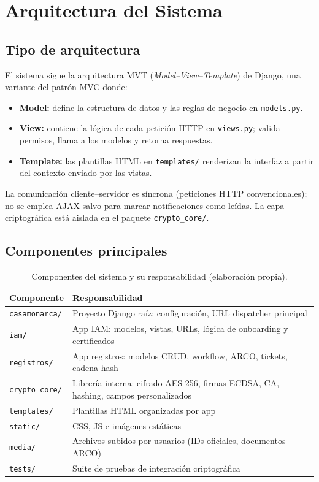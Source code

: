\documentclass[10pt,letterpaper]{report}
\begin{document}
\chapter{Arquitectura del Sistema}

\section{Tipo de arquitectura}

El sistema sigue la arquitectura MVT (\textit{Model--View--Template}) de Django, una variante del patrón MVC donde:
\begin{itemize}[leftmargin=*]
    \item \textbf{Model:} define la estructura de datos y las reglas de negocio en \texttt{models.py}.
    \item \textbf{View:} contiene la lógica de cada petición HTTP en \texttt{views.py}; valida permisos, llama a los modelos y retorna respuestas.
    \item \textbf{Template:} las plantillas HTML en \texttt{templates/} renderizan la interfaz a partir del contexto enviado por las vistas.
\end{itemize}

La comunicación cliente--servidor es síncrona (peticiones HTTP convencionales); no se emplea AJAX salvo para marcar notificaciones como leídas. La capa criptográfica está aislada en el paquete \texttt{crypto\_core/}.

\section{Componentes principales}

\begin{table}[h!]
\centering
\caption{Componentes del sistema y su responsabilidad (elaboración propia).}
\label{tab:componentes}
\begin{tabularx}{\textwidth}{l X}
\toprule
\textbf{Componente} & \textbf{Responsabilidad} \\
\midrule
\texttt{casamonarca/} & Proyecto Django raíz: configuración, URL dispatcher principal \\
\texttt{iam/} & App IAM: modelos, vistas, URLs, lógica de onboarding y certificados \\
\texttt{registros/} & App registros: modelos CRUD, workflow, ARCO, tickets, cadena hash \\
\texttt{crypto\_core/} & Librería interna: cifrado AES-256, firmas ECDSA, CA, hashing, campos personalizados \\
\texttt{templates/} & Plantillas HTML organizadas por app \\
\texttt{static/} & CSS, JS e imágenes estáticas \\
\texttt{media/} & Archivos subidos por usuarios (IDs oficiales, documentos ARCO) \\
\texttt{tests/} & Suite de pruebas de integración criptográfica \\
\bottomrule
\end{tabularx}
\end{table}
\end{document}
